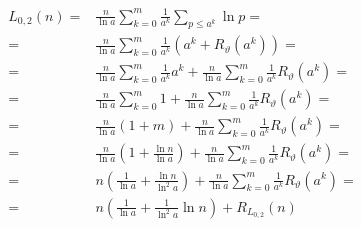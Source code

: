 \documentclass{article}
\begin{document}
\begin{align*}
L_{0,2}(n) =& \frac{n}{\ln{a}} \sum_{k=0}^{m} \frac{1}{a^k} \sum_{p \le a^k} \ln{p} = \\
=& \frac{n}{\ln{a}} \sum_{k=0}^{m} \frac{1}{a^k} \left( a^k + R_{\vartheta}(a^k) \right) = \\
=& \frac{n}{\ln{a}} \sum_{k=0}^{m} \frac{1}{a^k} a^k + \frac{n}{\ln{a}} \sum_{k=0}^{m} \frac{1}{a^k} R_{\vartheta}(a^k) = \\
=& \frac{n}{\ln{a}} \sum_{k=0}^{m} 1 + \frac{n}{\ln{a}} \sum_{k=0}^{m} \frac{1}{a^k} R_{\vartheta}(a^k) = \\
=& \frac{n}{\ln{a}} \left( 1 + m \right) + \frac{n}{\ln{a}} \sum_{k=0}^{m} \frac{1}{a^k} R_{\vartheta}(a^k) = \\
=& \frac{n}{\ln{a}} \left( 1 + \frac{\ln{n}}{\ln{a}} \right) + \frac{n}{\ln{a}} \sum_{k=0}^{m} \frac{1}{a^k} R_{\vartheta}(a^k) = \\
=& n \left( \frac{1}{\ln{a}} + \frac{\ln{n}}{\ln^2{a}} \right) + \frac{n}{\ln{a}} \sum_{k=0}^{m} \frac{1}{a^k} R_{\vartheta}(a^k) = \\
=& n \left( \frac{1}{\ln{a}} + \frac{1}{\ln^2{a}} \ln{n} \right) + R_{L_{0,2}}(n)
\end{align*}
\end{document}

